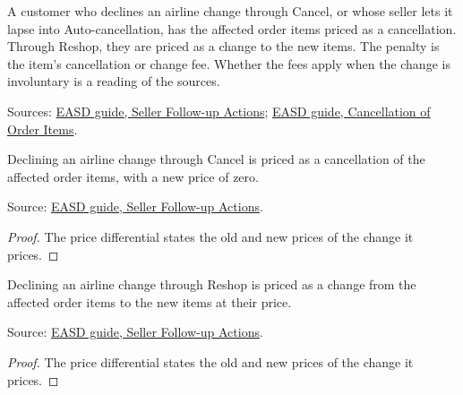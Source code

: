 \begin{definition}
  \label{def:airline-change-decline}
  A customer who declines an airline change through Cancel, or whose seller
  lets it lapse into Auto-cancellation, has the affected order items priced
  as a cancellation.  Through Reshop, they are priced as a change to the new
  items.  The penalty is the item's cancellation or change fee.  Whether the
  fees apply when the change is involuntary is a reading of the sources.

  Sources: \href{https://standards.atlassian.net/wiki/spaces/EASD/pages/574849094}{EASD guide, Seller Follow-up Actions};
  \href{https://standards.atlassian.net/wiki/spaces/EASD/pages/574783569}{EASD guide, Cancellation of Order Items}.
\end{definition}

\begin{theorem}
  \label{thm:airline-change-decline-cancel-prices}
  Declining an airline change through Cancel is priced as a cancellation of
  the affected order items, with a new price of zero.

  Source: \href{https://standards.atlassian.net/wiki/spaces/EASD/pages/574849094}{EASD guide, Seller Follow-up Actions}.
\end{theorem}
\begin{proof}
  The price differential states the old and new prices of the change it
  prices.
\end{proof}

\begin{theorem}
  \label{thm:airline-change-decline-reshop-prices}
  Declining an airline change through Reshop is priced as a change from the
  affected order items to the new items at their price.

  Source: \href{https://standards.atlassian.net/wiki/spaces/EASD/pages/574849094}{EASD guide, Seller Follow-up Actions}.
\end{theorem}
\begin{proof}
  The price differential states the old and new prices of the change it
  prices.
\end{proof}


